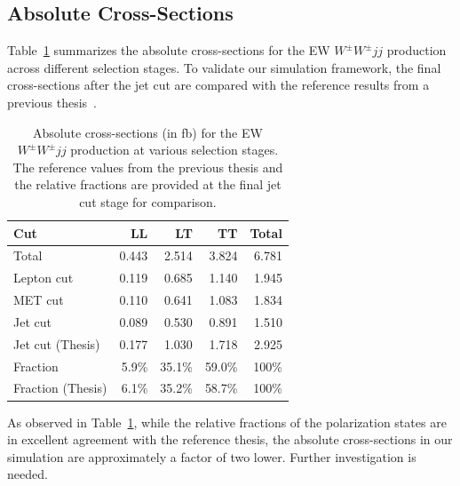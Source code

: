 \documentclass[12pt]{article}
\begin{document}

    \subsection{Absolute Cross-Sections}%
    \label{sub:absolute_cross_sections}

        Table~\ref{tab:EW_WWjj_abs_cross_section} summarizes the absolute cross-sections for the EW $W^{\pm}W^{\pm}jj$ production across different selection stages. To validate our simulation framework, the final cross-sections after the jet cut are compared with the reference results from a previous thesis~\cite{stange2025longitudinal}.

        \begin{table}[htpb]
            \centering
            \caption{Absolute cross-sections (in fb) for the EW $W^{\pm}W^{\pm}jj$ production at various selection stages. The reference values from the previous thesis and the relative fractions are provided at the final jet cut stage for comparison.}
            \label{tab:EW_WWjj_abs_cross_section}
            \begin{tabular}{l|rrrr}
                \hline
                Cut & LL & LT & TT & Total \\ \hline
                Total            & 0.443 & 2.514 & 3.824 & 6.781 \\
                Lepton cut       & 0.119 & 0.685 & 1.140 & 1.945 \\
                MET cut          & 0.110 & 0.641 & 1.083 & 1.834 \\
                Jet cut          & 0.089 & 0.530 & 0.891 & 1.510 \\ \hline
                Jet cut (Thesis) & 0.177 & 1.030 & 1.718 & 2.925 \\ \hline
                Fraction         & 5.9\% & 35.1\% & 59.0\% & 100\% \\
                Fraction (Thesis)& 6.1\% & 35.2\% & 58.7\% & 100\% \\ \hline
            \end{tabular}
        \end{table}

        As observed in Table~\ref{tab:EW_WWjj_abs_cross_section}, while the relative fractions of the polarization states are in excellent agreement with the reference thesis, the absolute cross-sections in our simulation are approximately a factor of two lower. Further investigation is needed.
\end{document}
